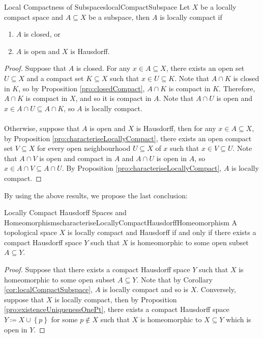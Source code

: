 \documentclass[math]{amznotes}
\theoremstyle{remark}
\begin{document}
\begin{corbox}{Local Compactness of Subspaces}{localCompactSubspace}
    Let $X$ be a locally compact space and $A \subseteq X$ be a subspace, then $A$ is locally compact if 
    \begin{enumerate}
        \item $A$ is closed, or
        \item $A$ is open and $X$ is Hausdorff.
    \end{enumerate}
    \tcblower
    \begin{proof}
        Suppose that $A$ is closed. For any $x \in A \subseteq X$, there exists an open set $U \subseteq X$ and a compact set $K \subseteq X$ such that $x \in U \subseteq K$. Note that $A \cap K$ is closed in $K$, so by Proposition \ref{pro:closedCompact}, $A \cap K$ is compact in $K$. Therefore, $A \cap K$ is compact in $X$, and so it is compact in $A$. Note that $A \cap U$ is open and $x \in A \cap U \subseteq A \cap K$, so $A$ is locally compact. 
        \\\\
        Otherwise, suppose that $A$ is open and $X$ is Hausdorff, then for any $x \in A \subseteq X$, by Proposition \ref{pro:characteriseLocallyCompact}, there exists an open compact set $V \subseteq X$ for every open neighbourhood $U \subseteq X$ of $x$ such that $x \in V \subseteq U$. Note that $A \cap V$ is open and compact in $A$ and $A \cap U$ is open in $A$, so $x \in A \cap V \subseteq A \cap U$. By Proposition \ref{pro:characteriseLocallyCompact}, $A$ is locally compact.
    \end{proof}
\end{corbox}
By using the above results, we propose the last conclusion:
\begin{corbox}{Locally Compact Hausdorff Spaces and Homeomorphisms}{characteriseLocallyCompactHausdorffHomeomorphism}
    A topological space $X$ is locally compact and Hausdorff if and only if there exists a compact Hausdorff space $Y$ such that $X$ is homeomorphic to some open subset $A \subseteq Y$.
    \tcblower
    \begin{proof}
        Suppose that there exists a compact Hausdorff space $Y$ such that $X$ is homeomorphic to some open subset $A \subseteq Y$. Note that by Corollary \ref{cor:localCompactSubspace}, $A$ is locally compact and so is $X$. Conversely, suppose that $X$ is locally compact, then by Proposition \ref{pro:existenceUniquenessOnePt}, there exists a compact Hausdorff space $Y \coloneqq X \cup \left\{p\right\}$ for some $p \notin X$ such that $X$ is homeomorphic to $X \subseteq Y$ which is open in $Y$.
    \end{proof}
\end{corbox}
\end{document}

